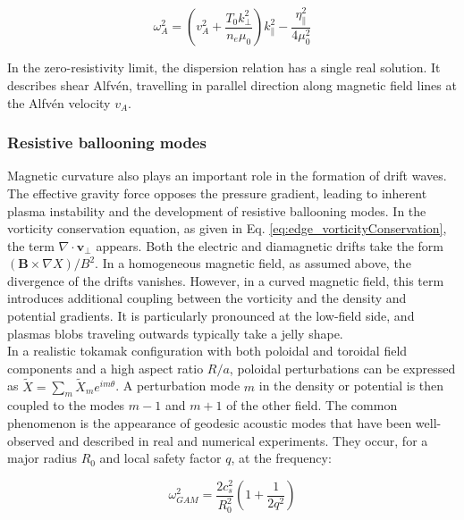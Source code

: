 \begin{equation}
	\label{eq:dispersionRelation}
	\omega_A^2 = \left(v_A^2 + \frac{T_0 k_\perp^2}{n_e \mu_0}\right) k_\parallel^2 - \frac{\eta_\parallel^2}{4\mu_0^2}
\end{equation}

In the zero-resistivity limit, the dispersion relation has a single real solution. It describes shear Alfvén, travelling in parallel direction along magnetic field lines at the Alfvén velocity $v_A$.


\subsubsection{Resistive ballooning modes}

Magnetic curvature also plays an important role in the formation of drift waves. The effective gravity force opposes the pressure gradient, leading to inherent plasma instability and the development of resistive ballooning modes\cite{hastie2003drift}. In the vorticity conservation equation, as given in Eq. \ref{eq:edge_vorticityConservation}, the term $ \nabla \cdot \mathbf{v}_\perp $ appears. Both the electric and diamagnetic drifts take the form $ ( \mathbf{B} \times \nabla X)/B^2 $. In a homogeneous magnetic field, as assumed above, the divergence of the drifts vanishes. However, in a curved magnetic field, this term introduces additional coupling between the vorticity and the density and potential gradients. It is particularly pronounced at the low-field side, and plasmas blobs traveling outwards typically take a jelly shape. \\
In a realistic tokamak configuration with both poloidal and toroidal field components and a high aspect ratio $ R/a $, poloidal perturbations can be expressed as $ \tilde{X} = \sum_m \tilde{X}_m e^{im\theta} $. A perturbation mode $m$ in the density or potential is then coupled to the modes $ m-1 $ and $ m+1 $ of the other field. The common phenomenon is the appearance of geodesic acoustic modes that have been well-observed and described in real and numerical experiments\cite{conway2021geodesic}. They occur, for a major radius $R_0$ and local safety factor $q$, at the frequency:

\begin{equation}
	\omega^2_{GAM} = \frac{2c_s^2}{R_0^2}\left(1+\frac{1}{2q^2}\right)
\end{equation}

\vspace{2cm}

